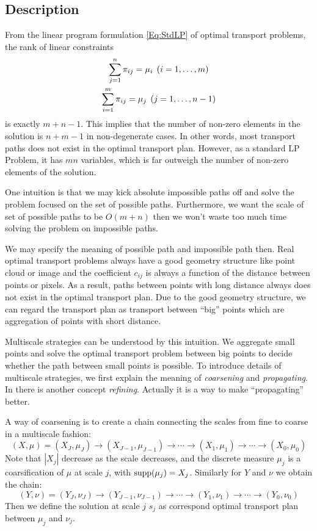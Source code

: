 \documentclass[english]{pkupaper}
\begin{document}
\subsection{Description}

From the linear program formulation \eqref{Eq:StdLP} of optimal transport problems, the rank of linear constraints 
\begin{gather}
\sum_{j=1}^n \pi_{ij} = \mu_i \mathbin{}\left(  i=1,\dots,m  \right)\\
\sum_{i=1}^m \pi_{ij} = \mu_j \mathbin{}\left(  j=1,\dots,n-1 \right)
\end{gather}
is exactly $m+n-1$. This implies that the number of non-zero elements in the solution is $n+m-1$ in non-degenerate cases. In other words, most transport paths does not exist in the optimal transport plan. 
However, as a standard LP Problem, it has $m n $ variables, which is far outweigh the number of non-zero elements of the solution.

One intuition is that we may kick absolute impossible paths off and solve the problem focused on the set of possible paths. Furthermore, we want the scale of set of possible paths to be $O(m+n)$ then we won't waste too much time solving the problem on impossible paths.

We may specify the meaning of possible path and impossible path then. Real optimal transport problems always have a good geometry structure like point cloud or image and the coefficient $c_{ij}$ is always a function of the distance between points or pixels. As a result, paths between points with long distance always does not exist in the optimal transport plan. Due to the good geometry structure, we can regard the transport plan as transport between ``big'' points which are aggregation of points with short distance.

Multiscale strategies can be understood by this intuition. We aggregate small points and solve the optimal transport problem between big points to decide whether the path between small points is possible. To introduce details of multiscale strategies, we first explain the meaning of \emph{coarsening} and \emph{propagating}. In \parencite{Gerber2017} there is another concept \emph{refining}. Actually it is a way to make ``propagating'' better.

A way of coarsening is to create a chain connecting the scales from fine to coarse in a multiscale fashion:
\begin{equation}
(X, \mu) = (X_J, \mu_J)\rightarrow(X_{J-1},\mu_{J-1})\rightarrow\cdots\rightarrow(X_1,\mu_1)\rightarrow\cdots\rightarrow(X_0,\mu_0)
\end{equation}
Note that $|X_j|$ decrease  as the scale decreases, and the discrete measure $\mu_j$ is a coarsification of $\mu$ at scale $j$, with $\operatorname{\mathrm{supp}}(\mu_j) = X_j$. Similarly for $Y$ and $\nu$ we obtain the chain:
\begin{equation}
(Y, \nu) = (Y_J, \nu_J)\rightarrow(Y_{J-1},\nu_{J-1})\rightarrow\cdots\rightarrow(Y_1,\nu_1)\rightarrow\cdots\rightarrow(Y_0,\nu_0)
\end{equation}
Then we define the solution at scale $j$ $s_j$ as correspond optimal transport plan between $\mu_j$ and $\nu_j$.
\end{document}
